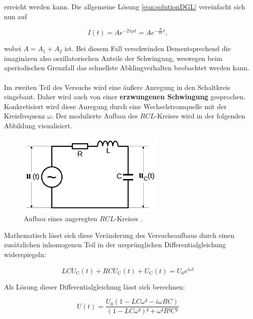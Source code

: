 \noindent erreicht werden kann. Die allgemeine Lösung \eqref{eqn:solutionDGL} vereinfacht sich nun auf 

\begin{equation*}
    I(t) = Ae^{-2\pi\mu{}t} = Ae^{-\frac{R}{2L}t},
\end{equation*}

\noindent wobei $A = A_1 + A_2$ ist. Bei diesem Fall verschwinden Dementsprechend die imaginären also oszillatorischen Anteile 
der Schwingung, weswegen beim aperiodischen Grenzfall das schnellste Abklingverhalten beobachtet werden kann.\\\\

\noindent Im zweiten Teil des Versuchs wird eine äußere Anregung in den Schaltkreis eingebaut. Daher wird auch von 
einer \textbf{erzwungenen Schwingung} gesprochen. Konkretisiert wird diese Anregung durch eine Wechselstromquelle mit 
der Kreisfrequenz $\omega$. Der modulierte Aufbau des $RCL$-Kreises wird in der folgenden Abbildung visualisiert.

\begin{figure}[H]
    \centering
    \includegraphics[height=4cm]{AnregungRCL.png}
    \caption{Aufbau eines angeregten $RCL$-Kreises \cite{Versuchsanleitung_v354}.}
    \label{fig:AnregungRCL}
\end{figure}

\noindent Mathematisch lässt sich diese Veränderung des Versuchsaufbaus durch einen zusätzlichen inhomogenen Teil in der 
ursprünglichen Differentialgleichung widerspiegeln:

\begin{equation*}
    LC\ddot{U}_\text{C}(t) + RC\dot{U}_\text{C}(t) + U_\text{C}(t) = U_0e^{i\omega{}t}
\end{equation*}

\noindent Als Lösung dieser Differentialgleichung lässt sich berechnen:

\begin{equation*}
    U(t) = \frac{U_0\left(1 - LC\omega² - i\omega RC\right)}{\left(1 - LC\omega²\right)² + \omega²R²C²}
\end{equation*}

